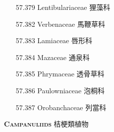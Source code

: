 \begin{enumerate}
\begin{enumerate}
        
      \item[57.379] Lentibulariaceae 狸藻科     
        
      \item[57.382] Verbenaceae 馬鞭草科     
        
      \item[57.383] Lamiaceae 唇形科     
        
      \item[57.384] Mazaceae 通泉科     
        
      \item[57.385] Phrymaceae 透骨草科     
        
      \item[57.386] Paulowniaceae 泡桐科     
        
      \item[57.387] Orobanchaceae 列當科     
        
    \end{enumerate}
\end{enumerate}
\vspace{2ex} 
\noindent \normalsize\textsc{\textbf{Campanuliids} 桔梗類植物}\selectfont \\
\footnotesize\selectfont
